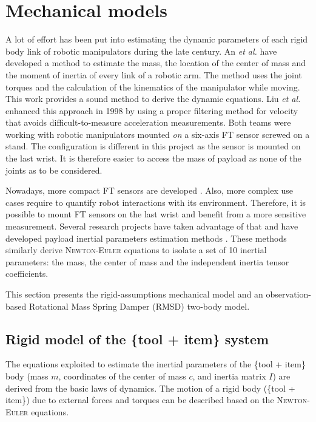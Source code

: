 \documentclass[/home/francois/latex/report/main.tex]{subfiles}
\begin{document}
\section{Mechanical models}
\label{section:mechanical-models}

A lot of effort has been put into estimating the dynamic parameters of each rigid body link of robotic manipulators during the late century. An \textit{et al.} \cite{An1985} have developed a method to estimate the mass, the location of the center of mass and the moment of inertia of every link of a robotic arm. The method uses the joint torques and the calculation of the kinematics of the manipulator while moving. This work provides a sound method to derive the dynamic equations. Liu \textit{et al.} enhanced this approach in 1998 \cite{Liu1998} by using a proper filtering method for velocity that avoids difficult-to-measure acceleration measurements. Both teams were working with robotic manipulators mounted \textit{on} a six-axis \ac{FT} sensor screwed on a stand. The configuration is different in this project as the sensor is mounted on the last wrist. It is therefore easier to access the mass of payload as none of the joints as to be considered.

Nowadays, more compact \ac{FT} sensors are developed \cite{Song2007, Beyeler}. Also, more complex use cases require to quantify robot interactions with its environment. Therefore, it is possible to mount \ac{FT} sensors on the last wrist and benefit from a more sensitive measurement. Several research projects have taken advantage of that and have developed payload inertial parameters estimation methods \cite{Kubus2008, Kubus2007, Kubus2014, Farsoni2018}. These methods similarly derive \textsc{Newton-Euler} equations to isolate a set of 10 inertial parameters: the mass, the center of mass and the independent inertia tensor coefficients.

This section presents the rigid-assumptions mechanical model and an observation-based Rotational Mass Spring Damper (RMSD) two-body model.

\subsection{Rigid model of the \{tool + item\} system}
\label{section:background:rigid}

The equations exploited to estimate the inertial parameters of the \{tool + item\} body (mass $m$, coordinates of the center of mass $c$, and inertia matrix $I$) are derived from the basic laws of dynamics. The motion of a rigid body (\{tool + item\}) due to external forces and torques can be described based on the \textsc{Newton-Euler} equations.
\end{document}
